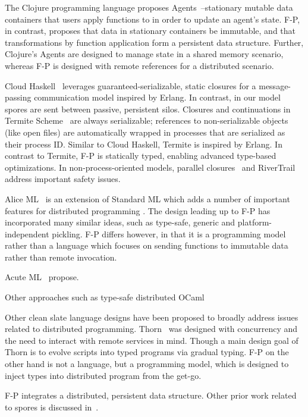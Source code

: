 \documentclass[preprint]{sigplanconf}
\theoremstyle{definition}
\theoremstyle{definition}
\begin{document}
The Clojure programming language proposes Agents~\cite{Clojure}--stationary
mutable data containers that users apply functions to in order to update an
agent's state. F-P, in contrast, proposes that data in stationary containers
be immutable, and that transformations by function application form a
persistent data structure. Further, Clojure's Agents are designed to manage
state in a shared memory scenario, whereas F-P is designed with remote
references for a distributed scenario.

Cloud Haskell~\cite{CloudHaskell} leverages guaranteed-serializable, static
closures for a message-passing communication model inspired by Erlang. In
contrast, in our model spores are sent between passive, persistent silos.
Closures and continuations in Termite Scheme~\cite{TermiteScheme} are always
serializable; references to non-serializable objects (like open files) are
automatically wrapped in processes that are serialized as their process ID.
Similar to Cloud Haskell, Termite is inspired by Erlang. In contrast to
Termite, F-P is statically typed, enabling advanced type-based optimizations.
In non-process-oriented models, parallel closures~\cite{ParallelClosures} and
RiverTrail~\cite{RiverTrail} address important safety issues.

Alice ML~\cite{AliceML} is an extension of Standard ML which adds a number of
important features for distributed programming . The design
leading up to F-P has incorporated many similar ideas, such as {type-safe},
generic and platform-independent pickling. F-P differs however, in that it is
a programming model rather than a language which focuses on sending functions
to immutable data rather than remote invocation.

Acute ML~\cite{AcuteML} propose.

Other approaches such as type-safe distributed OCaml~\cite{DistOCaml}

Other clean slate language designs have been proposed to broadly address
issues related to distributed programming. Thorn~\cite{Thorn} was designed
with concurrency and the need to interact with remote services in mind. Though
a main design goal of Thorn is to evolve scripts into typed programs via
gradual typing. F-P on the other hand is not a language, but a programming
model, which is designed to inject types into distributed program from the
get-go.

F-P integrates a distributed, persistent data structure. Other prior work
related to spores is discussed in~\cite{Spores}.
\end{document}
